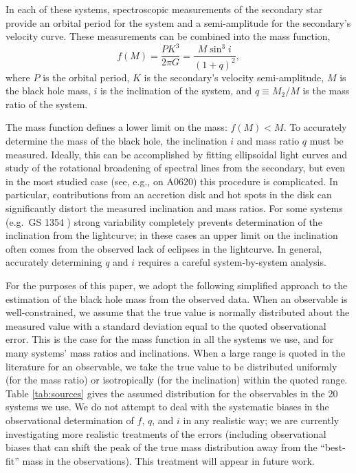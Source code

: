 \documentclass[preprint]{aastex}
\begin{document}
In each of these systems, spectroscopic measurements of the secondary
star provide an orbital period for the system and a semi-amplitude for
the secondary's velocity curve.  These measurements can be combined
into the mass function,
\begin{equation}
  \label{eq:mass-function}
  f(M) = \frac{P K^3}{2\pi G} = \frac{M \sin^3 i}{\left( 1 + q \right)^2},
\end{equation}
where $P$ is the orbital period, $K$ is the secondary's velocity
semi-amplitude, $M$ is the black hole mass, $i$ is the inclination of
the system, and $q \equiv M_2 / M$ is the mass ratio of the system.

The mass function defines a lower limit on the mass: $f(M) < M$.  To
accurately determine the mass of the black hole, the inclination $i$
and mass ratio $q$ must be measured.  Ideally, this can be
accomplished by fitting ellipsoidal light curves and study of the
rotational broadening of spectral lines from the secondary, but even
in the most studied case (see, e.g., \citet{Cantrell2010} on A0620)
this procedure is complicated.  In particular, contributions from an
accretion disk and hot spots in the disk can significantly distort the
measured inclination and mass ratios.  For some systems (e.g.\ GS 1354
\citep{Casares2009}) strong variability completely prevents
determination of the inclination from the lightcurve; in these cases
an upper limit on the inclination often comes from the observed lack
of eclipses in the lightcurve.  In general, accurately determining $q$
and $i$ requires a careful system-by-system analysis.

For the purposes of this paper, we adopt the following simplified
approach to the estimation of the black hole mass from the observed
data.  When an observable is well-constrained, we assume that the true
value is normally distributed about the measured value with a standard
deviation equal to the quoted observational error.  This is the case
for the mass function in all the systems we use, and for many systems'
mass ratios and inclinations.  When a large range is quoted in the
literature for an observable, we take the true value to be distributed
uniformly (for the mass ratio) or isotropically (for the inclination)
within the quoted range.  Table \ref{tab:sources} gives the assumed
distribution for the observables in the 20 systems we use.  We do not
attempt to deal with the systematic biases in the observational
determination of $f$, $q$, and $i$ in any realistic way; we are
currently investigating more realistic treatments of the errors
(including observational biases that can shift the peak of the true
mass distribution away from the ``best-fit'' mass in the
observations).  This treatment will appear in future work.
\end{document}
